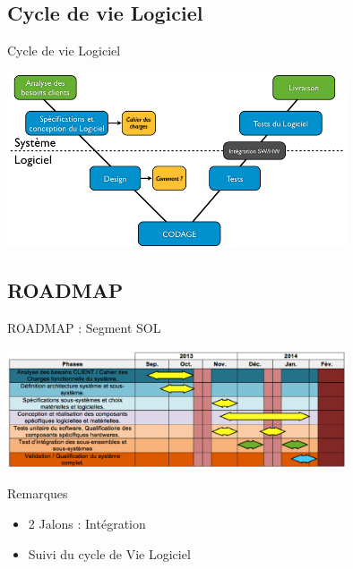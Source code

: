 \documentclass[11pt]{beamer}
\begin{document}
	\subsection{Cycle de vie Logiciel}
	\begin{frame}{Cycle de vie Logiciel}
		\begin{center}
			\includegraphics[width=10cm]{common/V.png}
		\end{center}
	\end{frame}
	\subsection{ROADMAP}
	\begin{frame}{ROADMAP : Segment SOL}
		\begin{center}
			\includegraphics[width=10cm]{common/roadmap.png}
		\end{center}
		\begin{block}{Remarques}
		\begin{itemize}
			\item 2 Jalons : Intégration
			\item Suivi du cycle de Vie Logiciel
		\end{itemize}
		\end{block}
	\end{frame}
	
\end{document}
